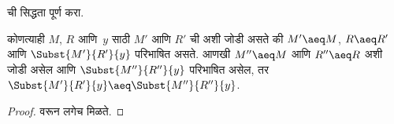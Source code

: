 \documentclass[../../../include/open-logic-section]{subfiles}
\begin{document}
\begin{prob}
   ची सिद्धता पूर्ण करा.
\end{prob}

\begin{cor}
  कोणत्याही $M$, $R$ आणि~$y$ साठी $M'$ आणि $R'$ ची
  अशी जोडी असते की $M' \aeq M$, $R \aeq R'$
  आणि $\Subst{M'}{R'}{y}$ परिभाषित असते. आणखी
  $M'' \aeq M$ आणि $R'' \aeq R$ अशी जोडी असेल
  आणि $\Subst{M''}{R''}{y}$ परिभाषित असेल, तर
  $\Subst{M'}{R'}{y} \aeq
  \Subst{M''}{R''}{y}$.
\end{cor}

\begin{proof}
   वरून लगेच मिळते.
\end{proof}
\end{document}
